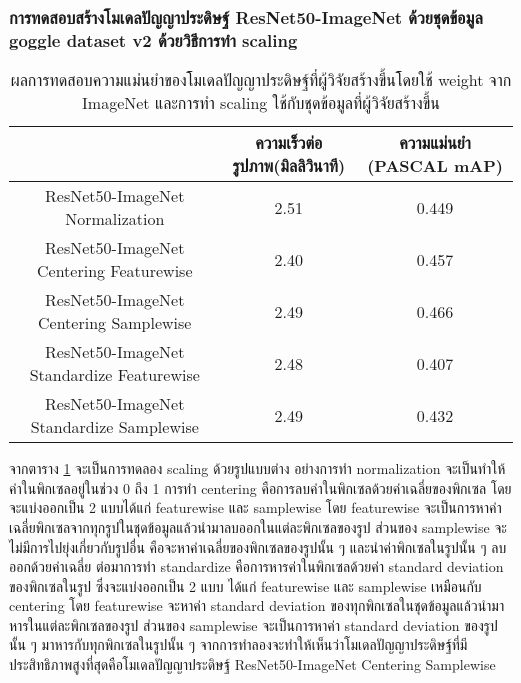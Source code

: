 \subsubsection{การทดสอบสร้างโมเดลปัญญาประดิษฐ์ ResNet50-ImageNet ด้วยชุดข้อมูล goggle dataset v2 ด้วยวิธีการทำ scaling}
\begin{table}[!ht]
	\centering
	\begin{tabular}{|c|c|c|}
			\hline
			{}&{ความเร็วต่อรูปภาพ(มิลลิวินาที)}&{ความแม่นยำ (PASCAL mAP)}			\\
			\hline
			ResNet50-ImageNet	 Normalization				& 2.51			& 0.449				\\
			ResNet50-ImageNet	 Centering Featurewise		& 2.40			& 0.457				\\
			ResNet50-ImageNet	 Centering Samplewise		& 2.49			& 0.466				\\
			ResNet50-ImageNet	 Standardize Featurewise		& 2.48			& 0.407				\\
			ResNet50-ImageNet	 Standardize Samplewise		& 2.49			& 0.432				\\
			\hline
	\end{tabular}
\caption{ผลการทดสอบความแม่นยำของโมเดลปัญญาประดิษฐ์ที่ผู้วิจัยสร้างขึ้นโดยใช้ weight จาก ImageNet และการทำ scaling ใช้กับชุดข้อมูลที่ผู้วิจัยสร้างขึ้น}
\label{tab: Test PASCAL mAP of dataset created by the researcher with pretrain weight imagenet and scaling}
\end{table}

จากตาราง \ref{tab: Test PASCAL mAP of dataset created by the researcher with pretrain weight imagenet and scaling} จะเป็นการทดลอง scaling ด้วยรูปแบบต่าง อย่างการทำ normalization จะเป็นทำให้ค่าในพิกเซลอยู่ในช่วง 0 ถึง 1 การทำ centering คือการลบค่าในพิกเซลด้วยค่าเฉลี่ยของพิกเซล โดยจะแบ่งออกเป็น 2 แบบได้แก่ featurewise และ samplewise โดย featurewise จะเป็นการหาค่าเฉลี่ยพิกเซลจากทุกรูปในชุดข้อมูลแล้วนำมาลบออกในแต่ละพิกเซลของรูป ส่วนของ samplewise จะไม่มีการไปยุ่งเกี่ยวกับรูปอื่น คือจะหาค่าเฉลี่ยของพิกเซลของรูปนั้น ๆ และนำค่าพิกเซลในรูปนั้น ๆ ลบออกด้วยค่าเฉลี่ย ต่อมาการทำ standardize คือการหารค่าในพิกเซลด้วยค่า standard deviation ของพิกเซลในรูป ซึ่งจะแบ่งออกเป็น 2 แบบ ได้แก่ featurewise และ samplewise เหมือนกับ centering โดย featurewise จะหาค่า standard deviation ของทุกพิกเซลในชุดข้อมูลแล้วนำมาหารในแต่ละพิกเซลของรูป ส่วนของ samplewise จะเป็นการหาค่า standard deviation ของรูปนั้น ๆ มาหารกับทุกพิกเซลในรูปนั้น ๆ จากการทำลองจะทำให้เห็นว่าโมเดลปัญญาประดิษฐ์ที่มีประสิทธิภาพสูงที่สุดคือโมเดลปัญญาประดิษฐ์ ResNet50-ImageNet	 Centering Samplewise
\clearpage
